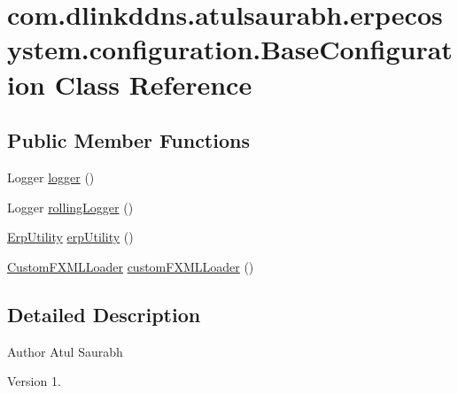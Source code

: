 \hypertarget{classcom_1_1dlinkddns_1_1atulsaurabh_1_1erpecosystem_1_1configuration_1_1_base_configuration}{}\section{com.\+dlinkddns.\+atulsaurabh.\+erpecosystem.\+configuration.\+Base\+Configuration Class Reference}
\label{classcom_1_1dlinkddns_1_1atulsaurabh_1_1erpecosystem_1_1configuration_1_1_base_configuration}
\subsection*{Public Member Functions}
\begin{DoxyCompactItemize}
\item 
Logger \mbox{\hyperlink{classcom_1_1dlinkddns_1_1atulsaurabh_1_1erpecosystem_1_1configuration_1_1_base_configuration_a1e3b30da635356fabf646a14241b116d}{logger}} ()
\item 
Logger \mbox{\hyperlink{classcom_1_1dlinkddns_1_1atulsaurabh_1_1erpecosystem_1_1configuration_1_1_base_configuration_ab280a65420b19fb7b76218a39ab6db67}{rolling\+Logger}} ()
\item 
\mbox{\hyperlink{interfacecom_1_1dlinkddns_1_1atulsaurabh_1_1erpecosystem_1_1util_1_1_erp_utility}{Erp\+Utility}} \mbox{\hyperlink{classcom_1_1dlinkddns_1_1atulsaurabh_1_1erpecosystem_1_1configuration_1_1_base_configuration_ac854d5f3ef3af3b9d6d219808815d396}{erp\+Utility}} ()
\item 
\mbox{\hyperlink{classcom_1_1dlinkddns_1_1atulsaurabh_1_1erpecosystem_1_1loader_1_1_custom_f_x_m_l_loader}{Custom\+F\+X\+M\+L\+Loader}} \mbox{\hyperlink{classcom_1_1dlinkddns_1_1atulsaurabh_1_1erpecosystem_1_1configuration_1_1_base_configuration_ad02c1d56c9b4481c9011b4c3825dd10a}{custom\+F\+X\+M\+L\+Loader}} ()
\end{DoxyCompactItemize}


\subsection{Detailed Description}
\begin{DoxyAuthor}{Author}
Atul Saurabh 
\end{DoxyAuthor}
\begin{DoxyVersion}{Version}
1. 
\end{DoxyVersion}


